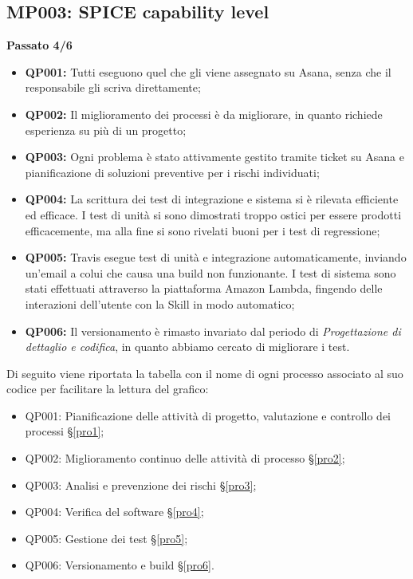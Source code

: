 \subsection{MP003: SPICE capability level}
\textbf{Passato 4/6}
\begin{itemize}
	\item \textbf{QP001:} Tutti eseguono quel che gli viene assegnato su Asana, senza che il responsabile gli scriva direttamente;
	\item \textbf{QP002:} Il miglioramento dei processi è da migliorare, in quanto richiede esperienza su più di un progetto;
	\item \textbf{QP003:} Ogni problema è stato attivamente gestito tramite ticket su Asana e pianificazione di soluzioni preventive per i rischi individuati;
	\item \textbf{QP004:} La scrittura dei test di integrazione e sistema si è rilevata efficiente ed efficace. I test di unità si sono dimostrati troppo ostici per essere prodotti efficacemente, ma alla fine si sono rivelati buoni per i test di regressione;
	\item \textbf{QP005:} Travis esegue test di unità e integrazione automaticamente, inviando un'email a colui che causa una build non funzionante. I test di sistema sono stati effettuati attraverso la piattaforma Amazon Lambda, fingendo delle interazioni dell'utente con la Skill in modo automatico;
	\item \textbf{QP006:} Il versionamento è rimasto invariato dal periodo di \textit{Progettazione di dettaglio e codifica}, in quanto abbiamo cercato di migliorare i test.
\end{itemize}
Di seguito viene riportata la tabella con il nome di ogni processo associato al suo codice per facilitare la lettura del grafico:
\begin{itemize}
	\item QP001: Pianificazione delle attività di progetto, valutazione e controllo dei processi \S\ref{pro1};
	\item QP002: Miglioramento continuo delle attività di processo \S\ref{pro2};
	\item QP003: Analisi e prevenzione dei rischi \S\ref{pro3};
	\item QP004: Verifica del software \S\ref{pro4};
	\item QP005: Gestione dei test \S\ref{pro5};
	\item QP006: Versionamento e build \S\ref{pro6}.
\end{itemize}
